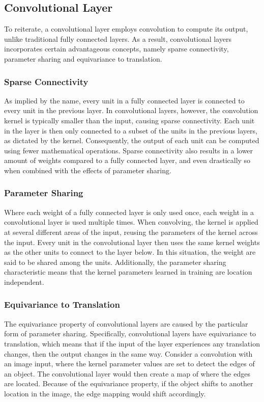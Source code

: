 \subsection{Convolutional Layer}

To reiterate, a convolutional layer employs convolution to compute its output, unlike traditional fully connected layers. As a result, convolutional layers incorporates certain advantageous concepts, namely sparse connectivity, parameter sharing and equivariance to translation.

\subsubsection{Sparse Connectivity}

As implied by the name, every unit in a fully connected layer is connected to every unit in the previous layer. In convolutional layers, however, the convolution kernel is typically smaller than the input, causing sparse connectivity. Each unit in the layer is then only connected to a subset of the units in the previous layers, as dictated by the kernel. Consequently, the output of each unit can be computed using fewer mathematical operations. Sparse connectivity also results in a lower amount of weights compared to a fully connected layer, and even drastically so when combined with the effects of parameter sharing.

\subsubsection{Parameter Sharing}

Where each weight of a fully connected layer is only used once, each weight in a convolutional layer is used multiple times. When convolving, the kernel is applied at several different areas of the input, reusing the parameters of the kernel across the input. Every unit in the convolutional layer then uses the same kernel weights as the other units to connect to the layer below. In this situation, the weight are said to be shared among the units. Additionally, the parameter sharing characteristic means that the kernel parameters learned in training are location independent.

\subsubsection{Equivariance to Translation}

The equivariance property of convolutional layers are caused by the particular form of parameter sharing. Specifically, convolutional layers have equivariance to translation, which means that if the input of the layer experiences any translation changes, then the output changes in the same way. Consider a convolution with an image input, where the kernel parameter values are set to detect the edges of an object. The convolutional layer would then create a map of where the edges are located. Because of the equivariance property, if the object shifts to another location in the image, the edge mapping would shift accordingly.

